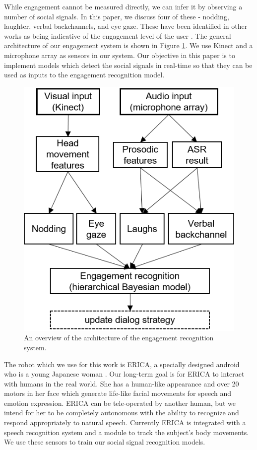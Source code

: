 \documentclass[letterpaper]{article} %
\begin{document}
While engagement cannot be measured directly, we can infer it by observing a number of social signals. In this paper, we discuss four of these - nodding, laughter, verbal backchannels, and eye gaze. These have been identified in other works as being indicative of the engagement level of the user \cite{Rich2010,Xu2013,Oertel2015}. The general architecture of our engagement system is shown in Figure \ref{engagementmodel}. We use Kinect and a microphone array as sensors in our system. Our objective in this paper is to implement models which detect the social signals in real-time so that they can be used as inputs to the engagement recognition model.

\begin{figure}
\centering
\includegraphics{engagementmodel.png}
\caption{An overview of the architecture of the engagement recognition system.}
\label{engagementmodel}
\end{figure}

The robot which we use for this work is ERICA, a specially designed android who is a young Japanese woman \cite{Glas2016}. Our long-term goal is for ERICA to interact with humans in the real world. She has a human-like appearance and over 20 motors in her face which generate life-like facial movements for speech and emotion expression. ERICA can be tele-operated by another human, but we intend for her to be completely autonomous with the ability to recognize and respond appropriately to natural speech. Currently ERICA is integrated with a speech recognition system and a module to track the subject's body movements. We use these sensors to train our social signal recognition models.
\end{document}
